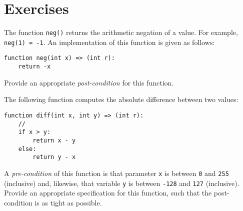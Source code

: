 \section{Exercises}

\begin{ex}
The function \lstinline{neg()} returns the arithmetic negation of a value.
For example, \lstinline{neg(1) = -1}.  An implementation of
this function is given as follows:
\begin{lstlisting}
function neg(int x) => (int r):
    return -x
\end{lstlisting}
Provide an appropriate {\em post-condition} for this function.
\end{ex}

\begin{ex}
  The following function computes the absolute difference between two values:

\begin{lstlisting}
function diff(int x, int y) => (int r):
    //
    if x > y:
        return x - y
    else:
        return y - x
\end{lstlisting}

A {\em pre-condition} of this function is that parameter \lstinline{x}
is between \lstinline{0} and \lstinline{255} (inclusive) and,
likewise, that variable \lstinline{y} is between \lstinline{-128} and
\lstinline{127} (inclusive).  Provide an appropriate specification for
this function, such that the post-condition is as tight as possible.
\end{ex}
